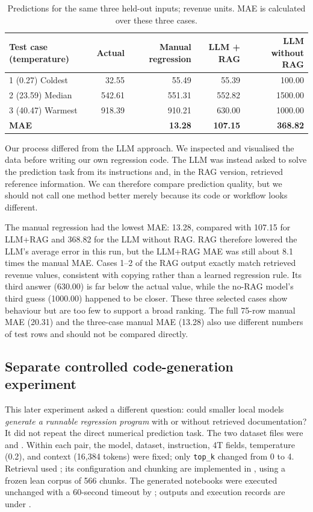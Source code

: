 \begin{table}[htbp]
\centering\small
\caption{Predictions for the same three held-out inputs; revenue units. MAE is calculated over these three cases.}
\label{tab:predictions}
\begin{tabular}{@{}lrrrr@{}}
\toprule
\textbf{Test case (temperature)} & \textbf{Actual} & \textbf{Manual regression} & \textbf{LLM + RAG} & \textbf{LLM without RAG}\\
\midrule
1 (0.27) Coldest  & 32.55  & 55.49  & 55.39  & 100.00\\
2 (23.59) Median & 542.61 & 551.31 & 552.82 & 1500.00\\
3 (40.47) Warmest & 918.39 & 910.21 & 630.00 & 1000.00\\
\midrule
\textbf{MAE} & & \textbf{13.28} & \textbf{107.15} & \textbf{368.82}\\
\bottomrule
\end{tabular}
\end{table}

Our process differed from the LLM approach.
We inspected and visualised the data before writing our own regression code.
The LLM was instead asked to solve the prediction task from its instructions and, in the RAG version, retrieved reference information.
We can therefore compare prediction quality, but we should not call one method better merely because its code or workflow looks different.

The manual regression had the lowest MAE: 13.28, compared with 107.15 for LLM+RAG and 368.82 for the LLM without RAG.
RAG therefore lowered the LLM's average error in this run, but the LLM+RAG MAE was still about 8.1 times the manual MAE.
Cases 1--2 of the RAG output exactly match retrieved revenue values, consistent with copying rather than a learned regression rule.
Its third answer (630.00) is far below the actual value, while the no-RAG model's third guess (1000.00) happened to be closer.
These three selected cases show behaviour but are too few to support a broad ranking.
The full 75-row manual MAE (20.31) and the three-case manual MAE (13.28) also use different numbers of test rows and should not be compared directly.

\subsection{Separate controlled code-generation experiment}
This later experiment asked a different question: could smaller local models \emph{generate a runnable regression program} with or without
retrieved documentation?
It did not repeat the direct numerical prediction task.
The two dataset files were  and
.
Within each pair, the model, dataset, instruction, 4T fields, temperature (0.2), and context (16,384 tokens) were fixed; only \texttt{top\_k} changed from 0 to 4.
Retrieval used ; its configuration and chunking are implemented in
, using a frozen lean corpus of 566 chunks.
The generated notebooks were executed unchanged with a 60-second timeout by
; outputs and execution records are under .

